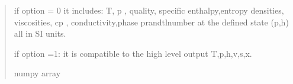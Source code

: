 \documentclass[letterpaper,10pt,english]{sphinxmanual}
\begin{document}
\begin{fulllineitems}
\begin{quote}
\begin{description}
\sphinxAtStartPar
{} \textendash{} if option = 0 it includes: T, p , quality, specific enthalpy,entropy
densities,
viscosities, cp , conductivity,phase prandtl\sphinxhyphen{}number
at the defined state (p,h)
all in SI units.

\sphinxAtStartPar
if option =1: it is compatible to the high level output
T,p,h,v,s,x.


\sphinxAtStartPar
numpy array

\end{description}\end{quote}

\end{fulllineitems}

\end{document}
